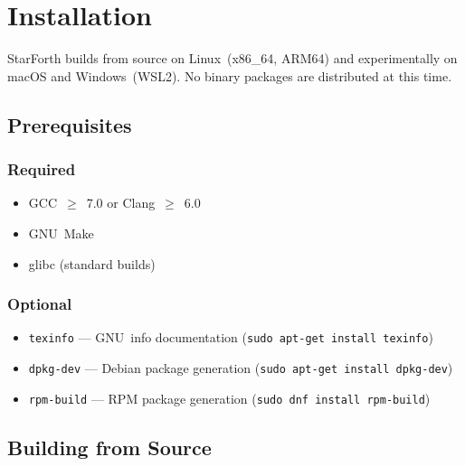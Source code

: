 
\section{Installation}
\label{sec:install}

StarForth builds from source on Linux~(x86\_64, ARM64) and experimentally on
macOS and Windows~(WSL2).  No binary packages are distributed at this time.

\subsection{Prerequisites}
\label{sec:install-prereqs}

\subsubsection*{Required}

\begin{itemize}
  \item GCC~$\geq$~7.0 or Clang~$\geq$~6.0
  \item GNU~Make
  \item glibc (standard builds)
\end{itemize}

\subsubsection*{Optional}

\begin{itemize}
  \item \texttt{texinfo} — GNU~info documentation
        (\texttt{sudo apt-get install texinfo})
  \item \texttt{dpkg-dev} — Debian package generation
        (\texttt{sudo apt-get install dpkg-dev})
  \item \texttt{rpm-build} — RPM package generation
        (\texttt{sudo dnf install rpm-build})
\end{itemize}

\subsection{Building from Source}
\label{sec:install-build}

